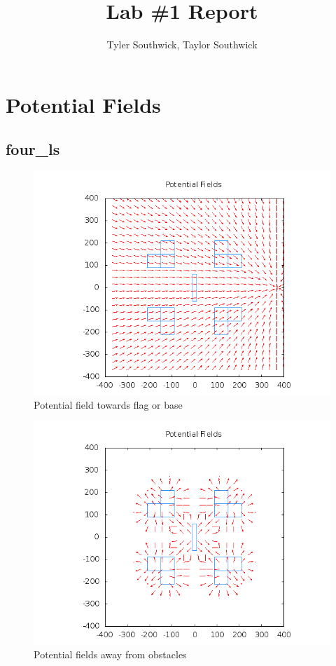 \documentclass[11pt]{article}
\begin{document}
\title{Lab \#1 Report}

\author{Tyler Southwick, Taylor Southwick}

\date{}

\maketitle

\section{Potential Fields}
\subsection{four\_ls}

\begin{figure}[h!]
	\caption{Potential field towards flag or base}
	\includegraphics[scale=.4]{plots/four_ls/pfFlag.png}
\end{figure}
\begin{figure}[h!]
	\caption{Potential fields away from obstacles}
	\includegraphics[scale=.4]{plots/four_ls/pfObstacles.png}
\end{figure}
\end{document}
